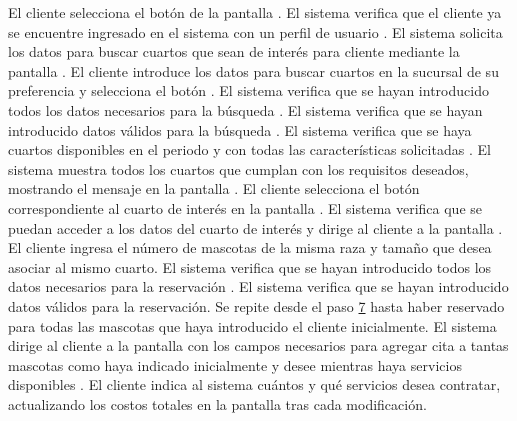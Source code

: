\begin{UCtrayectoria}
	\UCpaso[] El cliente selecciona  el botón  de la pantalla .
	\UCpaso[] El sistema verifica que el cliente ya se encuentre ingresado en el sistema con un perfil de usuario .
	\UCpaso[] El sistema solicita los datos para buscar cuartos que sean de interés para cliente mediante la pantalla .
	\UCpaso[] El cliente introduce los datos para buscar cuartos en la sucursal de su preferencia y selecciona el botón .
	\UCpaso[] El sistema verifica que se hayan introducido todos los datos necesarios para la búsqueda .
	\UCpaso[] El sistema verifica que se hayan introducido datos válidos para la búsqueda .
	\UCpaso[] El sistema verifica que se haya cuartos disponibles en el periodo y con todas las características solicitadas .
	\UCpaso[] \label{muestra_catalogo}El sistema muestra todos los cuartos que cumplan con los requisitos deseados, mostrando el mensaje  en la pantalla .
	\UCpaso[] El cliente selecciona el botón  correspondiente al cuarto de interés en la pantalla .
	\UCpaso[] El sistema verifica que se puedan acceder a los datos del cuarto de interés  y dirige al cliente a la pantalla .
	\UCpaso[] El cliente ingresa el número de mascotas de la misma raza y tamaño que desea asociar al mismo cuarto.
	\UCpaso[] El sistema verifica que se hayan introducido todos los datos necesarios para la reservación .
	\UCpaso[] El sistema verifica que se hayan introducido datos válidos para la reservación.
	\UCpaso[] Se repite desde el paso \hyperlink{muestra_catalogo}{7} hasta haber reservado para todas las mascotas que haya introducido el cliente inicialmente.
	\UCpaso[] El sistema dirige al cliente a la pantalla  con los campos necesarios para agregar cita a tantas mascotas como haya indicado inicialmente y desee mientras haya servicios disponibles .
	\UCpaso[] El cliente indica al sistema cuántos y qué servicios desea contratar, actualizando los costos totales en la pantalla tras cada modificación.

\end{UCtrayectoria}
